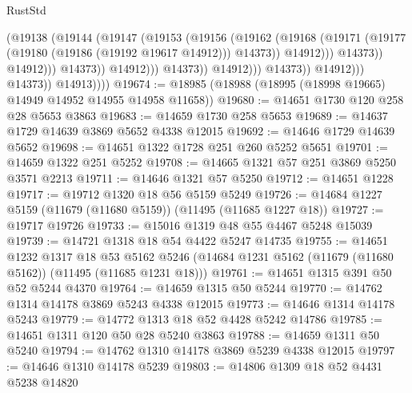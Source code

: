 \begin{lexlean}{RustStd}
\begin{coremodule}
                                                (@19138
                                                  (@19144
                                                    (@19147
                                                      (@19153
                                                        (@19156
                                                          (@19162
                                                            (@19168
                                                              (@19171
                                                                (@19177
                                                                  (@19180
                                                                    (@19186 (@19192 @19617 @14912)))
                                                                  @14373))
                                                              @14912)))
                                                        @14373))
                                                    @14912)))
                                              @14373))
                                          @14912)))
                                    @14373))
                                @14912)))
                          @14373))
                      @14912)))
                @14373))
            @14913))))
@19674 := @18985 (@18988 (@18995 (@18998 @19665) @14949 @14952 @14955 @14958 @11658))
@19680 := @14651 @1730 @120 @258 @28 @5653 @3863
@19683 := @14659 @1730 @258 @5653
@19689 := @14637 @1729 @14639 @3869 @5652 @4338 @12015
@19692 := @14646 @1729 @14639 @5652
@19698 := @14651 @1322 @1728 @251 @260 @5252 @5651
@19701 := @14659 @1322 @251 @5252
@19708 := @14665 @1321 @57 @251 @3869 @5250 @3571 @2213
@19711 := @14646 @1321 @57 @5250
@19712 := @14651 @1228
@19717 := @19712 @1320 @18 @56 @5159 @5249
@19726 := @14684 @1227 @5159 (@11679 (@11680 @5159)) (@11495 (@11685 @1227 @18))
@19727 := @19717 @19726
@19733 := @15016 @1319 @48 @55 @4467 @5248 @15039
@19739 := @14721 @1318 @18 @54 @4422 @5247 @14735
@19755 := @14651
    @1232
    @1317
    @18
    @53
    @5162
    @5246
    (@14684 @1231 @5162 (@11679 (@11680 @5162)) (@11495 (@11685 @1231 @18)))
@19761 := @14651 @1315 @391 @50 @52 @5244 @4370
@19764 := @14659 @1315 @50 @5244
@19770 := @14762 @1314 @14178 @3869 @5243 @4338 @12015
@19773 := @14646 @1314 @14178 @5243
@19779 := @14772 @1313 @18 @52 @4428 @5242 @14786
@19785 := @14651 @1311 @120 @50 @28 @5240 @3863
@19788 := @14659 @1311 @50 @5240
@19794 := @14762 @1310 @14178 @3869 @5239 @4338 @12015
@19797 := @14646 @1310 @14178 @5239
@19803 := @14806 @1309 @18 @52 @4431 @5238 @14820

\end{coremodule}
\end{lexlean}
